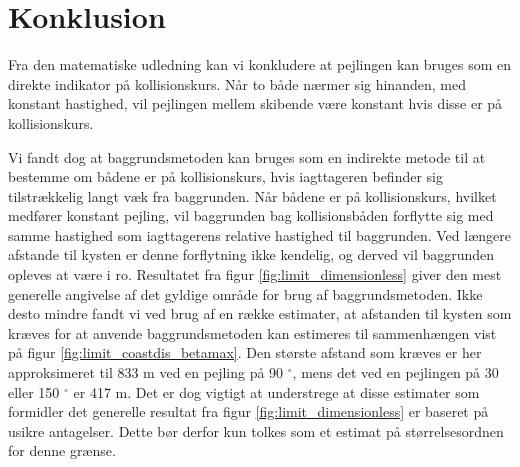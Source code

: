 \documentclass[%
 reprint,
nofootinbib,
aps,
]{revtex4-1}
\begin{document}
\section{Konklusion}
Fra den matematiske udledning kan vi konkludere at pejlingen kan bruges som en direkte indikator på kollisionskurs. Når to både nærmer sig hinanden, med konstant hastighed, vil pejlingen mellem skibende være konstant hvis disse er på kollisionskurs. \par
Vi fandt dog at baggrundsmetoden kan bruges som en indirekte metode til at bestemme om bådene er på kollisionskurs, hvis iagttageren befinder sig tilstrækkelig langt væk fra baggrunden. Når bådene er på kollisionskurs, hvilket medfører konstant pejling, vil baggrunden bag kollisionsbåden forflytte sig med samme hastighed som iagttagerens relative hastighed til baggrunden. Ved længere afstande til kysten er denne forflytning ikke kendelig, og derved vil baggrunden opleves at være i ro. Resultatet fra figur \ref{fig:limit_dimensionless} giver den mest generelle angivelse af det gyldige område for brug af baggrundsmetoden. Ikke desto mindre fandt vi ved brug af en række estimater, at afstanden til kysten som kræves for at anvende baggrundsmetoden kan estimeres til sammenhængen vist på figur \ref{fig:limit_coastdis_betamax}. Den største afstand som kræves er her approksimeret til 833 m ved en pejling på 90 $^{\circ}$, mens det ved en pejlingen på 30 eller 150 $^{\circ}$ er 417 m. Det er dog vigtigt at understrege at disse estimater som formidler det generelle resultat fra figur \ref{fig:limit_dimensionless} er baseret på usikre antagelser. Dette bør derfor kun tolkes som et estimat på størrelsesordnen for denne grænse.
\end{document}
